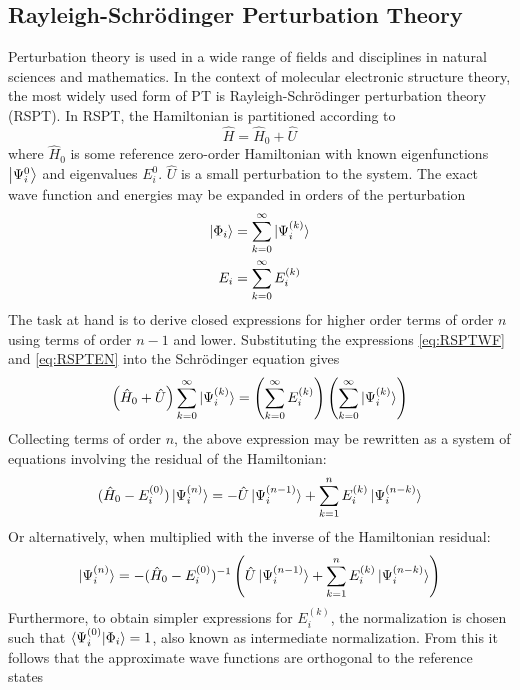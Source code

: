 \subsection{Rayleigh-Schrödinger Perturbation Theory}

Perturbation theory is used in a wide range of fields and disciplines in natural sciences and mathematics. In the context of molecular electronic structure theory, the most widely used form of PT is Rayleigh-Schrödinger perturbation theory (RSPT). In RSPT, the Hamiltonian is partitioned according to
\begin{equation}
\hat{H} = \hat{H}_0 + \hat{U}
\end{equation}
\noindent where $\hat{H}_0$ is some reference zero-order Hamiltonian with known eigenfunctions $\ket{\Psi^{0}_i}$ and eigenvalues $E_i^{0}$. $\hat{U}$ is a small perturbation to the system. The exact wave function and energies may be expanded in orders of the perturbation
\begin{align}
\ket{\Phi_i} &= \sum_{k=0}^{\infty} \ket{\smash{\Psi_i^{(k)}}} \label{eq:RSPTWF} \\
E_i &= \sum_{k=0}^{\infty} E_i^{(k)} \label{eq:RSPTEN}
\end{align} 
\noindent The task at hand is to derive closed expressions for higher order terms of order $n$ using terms of order $n-1$ and lower. Substituting the expressions \ref{eq:RSPTWF} and \ref{eq:RSPTEN} into the Schrödinger equation gives
\begin{equation}
\left(\hat{H}_0 + \hat{U}\right) \sum_{k=0}^{\infty} \ket{\smash{\Psi_i^{(k)}}} = \left( \sum_{k=0}^{\infty} E_i^{(k)} \right) \left( \sum_{k=0}^{\infty} \ket{\smash{\Psi_i^{(k)}}} \right)
\label{eq:RSPTSEQ}
\end{equation}
\noindent Collecting terms of order $n$, the above expression may be rewritten as a system of equations involving the residual of the Hamiltonian:
\begin{equation}
(\hat{H}_0 - E_i^{(0)}) \ket{\smash{\Psi_i^{(n)}}} = -\hat{U} \ket{\smash{\Psi_i^{(n-1)}}} + \sum_{k=1}^{n} E_i^{(k)} \ket{\smash{\Psi_i^{(n-k)}}}
\label{eq:RSPTSEQ2}
\end{equation}
\noindent Or alternatively, when multiplied with the inverse of the Hamiltonian residual:
\begin{equation}
 \ket{\smash{\Psi_i^{(n)}}} = - (\hat{H}_0 - E_i^{(0)})^{-1} \left( \hat{U} \ket{\smash{\Psi_i^{(n-1)}}} + \sum_{k=1}^{n} E_i^{(k)} \ket{\smash{\Psi_i^{(n-k)}}} \right)
\label{eq:RSPTSWF}
\end{equation}
\noindent Furthermore, to obtain simpler expressions for $E_i^{(k)}$, the normalization is chosen such that $\bra{\smash{\Psi_i^{(0)}}}\ket{\smash{\Phi_i}}=1$, also known as intermediate normalization. From this it follows that the approximate wave functions are orthogonal to the reference states
